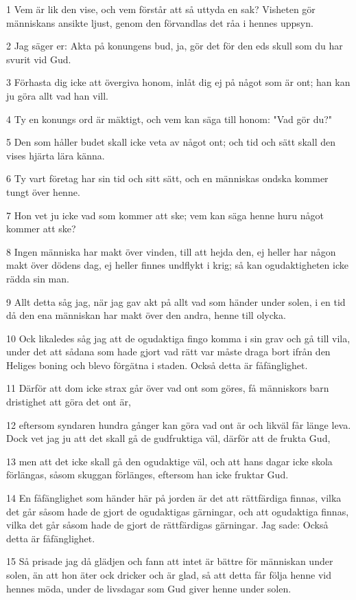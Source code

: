 \par 1 Vem är lik den vise, och vem förstår att så uttyda en sak? Visheten gör människans ansikte ljust, genom den förvandlas det råa i hennes uppsyn.
\par 2 Jag säger er: Akta på konungens bud, ja, gör det för den eds skull som du har svurit vid Gud.
\par 3 Förhasta dig icke att övergiva honom, inlåt dig ej på något som är ont; han kan ju göra allt vad han vill.
\par 4 Ty en konungs ord är mäktigt, och vem kan säga till honom: "Vad gör du?"
\par 5 Den som håller budet skall icke veta av något ont; och tid och sätt skall den vises hjärta lära känna.
\par 6 Ty vart företag har sin tid och sitt sätt, och en människas ondska kommer tungt över henne.
\par 7 Hon vet ju icke vad som kommer att ske; vem kan säga henne huru något kommer att ske?
\par 8 Ingen människa har makt över vinden, till att hejda den, ej heller har någon makt över dödens dag, ej heller finnes undflykt i krig; så kan ogudaktigheten icke rädda sin man.
\par 9 Allt detta såg jag, när jag gav akt på allt vad som händer under solen, i en tid då den ena människan har makt över den andra, henne till olycka.
\par 10 Ock likaledes såg jag att de ogudaktiga fingo komma i sin grav och gå till vila, under det att sådana som hade gjort vad rätt var måste draga bort ifrån den Heliges boning och blevo förgätna i staden. Också detta är fåfänglighet.
\par 11 Därför att dom icke strax går över vad ont som göres, få människors barn dristighet att göra det ont är,
\par 12 eftersom syndaren hundra gånger kan göra vad ont är och likväl får länge leva. Dock vet jag ju att det skall gå de gudfruktiga väl, därför att de frukta Gud,
\par 13 men att det icke skall gå den ogudaktige väl, och att hans dagar icke skola förlängas, såsom skuggan förlänges, eftersom han icke fruktar Gud.
\par 14 En fåfänglighet som händer här på jorden är det att rättfärdiga finnas, vilka det går såsom hade de gjort de ogudaktigas gärningar, och att ogudaktiga finnas, vilka det går såsom hade de gjort de rättfärdigas gärningar. Jag sade: Också detta är fåfänglighet.
\par 15 Så prisade jag då glädjen och fann att intet är bättre för människan under solen, än att hon äter ock dricker och är glad, så att detta får följa henne vid hennes möda, under de livsdagar som Gud giver henne under solen.
